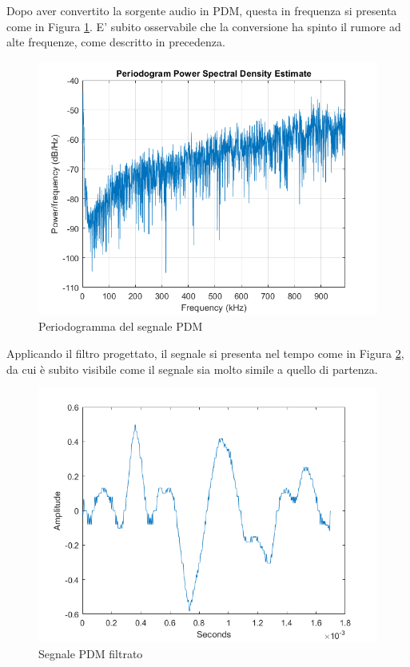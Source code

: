 \documentclass[a4paper, titlepage]{article}
\begin{document}
\noindent Dopo aver convertito la sorgente audio in PDM, questa in frequenza si presenta come in Figura \ref{fig:snap_per_PDM}. E' subito osservabile che la conversione ha spinto il rumore ad alte frequenze, come descritto in precedenza.
\begin{figure}[H]
    \centering
    \includegraphics[scale=0.45]{spettr_PDM.png}
    \caption{Periodogramma del segnale PDM}
    \label{fig:snap_per_PDM}
\end{figure}
\noindent Applicando il filtro progettato, il segnale si presenta nel tempo come in Figura \ref{fig:snap_per_PDM_filt}, da cui è subito visibile come il segnale sia molto simile a quello di partenza.
\begin{figure}[H]
    \centering
    \includegraphics[scale=0.45]{filtered.png}
    \caption{Segnale PDM filtrato}
    \label{fig:snap_per_PDM_filt}
\end{figure}
\end{document}
